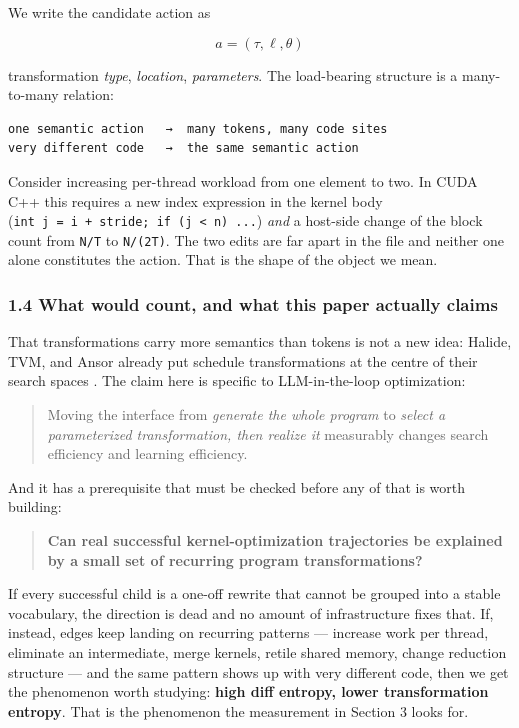 \documentclass[
  11pt,
]{article}
\begin{document}
We write the candidate action as

\[a = (\tau, \ell, \theta)\]

transformation \emph{type}, \emph{location}, \emph{parameters}. The load-bearing structure is a many-to-many relation:

\begin{verbatim}
one semantic action   →  many tokens, many code sites
very different code   →  the same semantic action
\end{verbatim}

Consider increasing per-thread workload from one element to two. In CUDA C++ this requires a new index expression in the kernel body (\texttt{int\ j\ =\ i\ +\ stride;\ if\ (j\ \textless{}\ n)\ ...}) \emph{and} a host-side change of the block count from \texttt{N/T} to \texttt{N/(2T)}. The two edits are far apart in the file and neither one alone constitutes the action. That is the shape of the object we mean.

\hypertarget{what-would-count-and-what-this-paper-actually-claims}{%
\subsubsection{1.4 What would count, and what this paper actually claims}\label{what-would-count-and-what-this-paper-actually-claims}}

That transformations carry more semantics than tokens is not a new idea: Halide, TVM, and Ansor already put schedule transformations at the centre of their search spaces \cite{halide8,tvm9,ansor10}. The claim here is specific to LLM-in-the-loop optimization:

\begin{quote}
Moving the interface from \emph{generate the whole program} to \emph{select a parameterized transformation, then realize it} measurably changes search efficiency and learning efficiency.
\end{quote}

And it has a prerequisite that must be checked before any of that is worth building:

\begin{quote}
\textbf{Can real successful kernel-optimization trajectories be explained by a small set of recurring program transformations?}
\end{quote}

If every successful child is a one-off rewrite that cannot be grouped into a stable vocabulary, the direction is dead and no amount of infrastructure fixes that. If, instead, edges keep landing on recurring patterns --- increase work per thread, eliminate an intermediate, merge kernels, retile shared memory, change reduction structure --- and the same pattern shows up with very different code, then we get the phenomenon worth studying: \textbf{high diff entropy, lower transformation entropy}. That is the phenomenon the measurement in Section 3 looks for.
\end{document}
